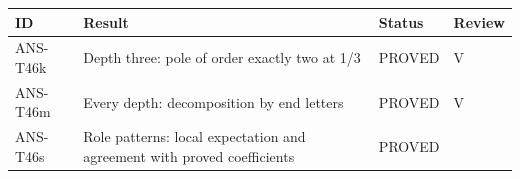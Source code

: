 \documentclass[
  11pt,
]{article}
\begin{document}
\begin{longtable}[]{@{}llll@{}}
\toprule
\begin{minipage}[b]{0.16\columnwidth}\raggedright
ID\strut
\end{minipage} & \begin{minipage}[b]{0.41\columnwidth}\raggedright
Result\strut
\end{minipage} & \begin{minipage}[b]{0.22\columnwidth}\raggedright
Status\strut
\end{minipage} & \begin{minipage}[b]{0.10\columnwidth}\raggedright
Review\strut
\end{minipage}\tabularnewline
\midrule
\endhead
\begin{minipage}[t]{0.16\columnwidth}\raggedright
ANS-T46k\strut
\end{minipage} & \begin{minipage}[t]{0.41\columnwidth}\raggedright
Depth three: pole of order exactly two at 1/3\strut
\end{minipage} & \begin{minipage}[t]{0.22\columnwidth}\raggedright
PROVED\strut
\end{minipage} & \begin{minipage}[t]{0.10\columnwidth}\raggedright
V\strut
\end{minipage}\tabularnewline
\begin{minipage}[t]{0.16\columnwidth}\raggedright
ANS-T46m\strut
\end{minipage} & \begin{minipage}[t]{0.41\columnwidth}\raggedright
Every depth: decomposition by end letters\strut
\end{minipage} & \begin{minipage}[t]{0.22\columnwidth}\raggedright
PROVED\strut
\end{minipage} & \begin{minipage}[t]{0.10\columnwidth}\raggedright
V\strut
\end{minipage}\tabularnewline
\begin{minipage}[t]{0.16\columnwidth}\raggedright
ANS-T46s\strut
\end{minipage} & \begin{minipage}[t]{0.41\columnwidth}\raggedright
Role patterns: local expectation and agreement with proved
coefficients\strut
\end{minipage} & \begin{minipage}[t]{0.22\columnwidth}\raggedright
PROVED\strut

\end{minipage}
\end{longtable}
\end{document}
